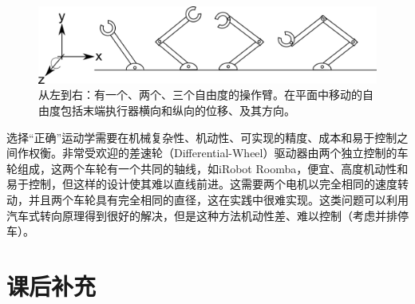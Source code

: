 \begin{figure}
	\centering
		\includegraphics[width=\textwidth]{figs/basickinematics.png}
	\caption{从左到右：有一个、两个、三个自由度的操作臂。在平面中移动的自由度包括末端执行器横向和纵向的位移、及其方向。}
	\label{fig:basickinematics}
\end{figure}


选择“正确”运动学需要在机械复杂性、机动性、可实现的精度、成本和易于控制之间作权衡。非常受欢迎的差速轮（Differential-Wheel）驱动器由两个独立控制的车轮组成，这两个车轮有一个共同的轴线，如iRobot Roomba，便宜、高度机动性和易于控制，但这样的设计使其难以直线前进。这需要两个电机以完全相同的速度转动，并且两个车轮具有完全相同的直径，这在实践中很难实现。这类问题可以利用汽车式转向原理得到很好的解决，但是这种方法机动性差、难以控制（考虑并排停车）。

\section*{课后补充}

